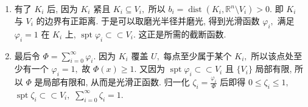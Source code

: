 \documentclass[../../main.tex]{subfiles}
\begin{document}
\begin{note}
\begin{enumerate}[(1)]
不能直接取一个充分小的正数$\varepsilon_i$去构造$K_i=\{x\in U:a_i(x)\geqslant \varepsilon _i\}$的原因：开集边界附近的点，其距离可以无限小。
因为 \(V_i\) 是开集，所以点 \(x\) 可以无限靠近 \(V_i\) 的边界。无论你预先给每个 \(V_i\) 选定了一个多么小的固定正数 \(\varepsilon_i\)，只要 \(x\) 离边界足够近，它到边界的距离 \(a_i(x)\) 就会比 \(\varepsilon_i\) 还要小。此时，这个点就不满足 \(a_i(x)\geqslant\varepsilon_i\)，从而被排除在 \(K_i\) 之外。进而导致$\{K_i\}$覆盖不了$U$.

为什么会导致覆盖失败？
假设点 \(x\) 只属于唯一的一个开集 \(V_i\) (即 \(x\notin V_j, j\neq i\))，且在 \(V_i\) 中非常靠近边界，使得
\(0<a_i(x)<\varepsilon_i.\)
由于 \(x\notin V_j\)，根据距离函数的定义，对于所有 \(j\neq i\)，都有 \(a_j(x)=0<\varepsilon_j.\) 于是，对所有的指标 \(k\)，都有 \(a_k(x)<\varepsilon_k.\) 这意味着 \(x\) 不属于任何 \(K_k\)，即
\(x\notin\bigcup\limits_{k=0}^{\infty}K_k.\)
这样一来，覆盖 \(U=\bigcup\limits_{k=0}^{\infty}K_k\) 就失败了。

具体反例(一维)：
取 \(U=(0,1)\)，设 \(V_1=(0,0.1)\)，\(V_2=(0.05,1)\)。假设你为 \(V_1\) 选取了 \(\varepsilon_1=0.01.\)
现在取点 \(x=0.001\)。显然 \(x\in V_1\)，但是 \(x\) 到 \(V_1\) 边界 \(0\) 的距离只有 \(0.001\)，即
\(a_1(0.001)=0.001<0.01=\varepsilon_1.\)
因此 \(x\notin K_1\)。又因为 \(x\notin V_2\)，所以 \(a_2(x)=0<\varepsilon_2\)，即 \(x\notin K_2\)。于是点 \(x=0.001\) 就被漏掉了，它不在任何 \(K_i\) 中。

\item 有了 $K_i$ 后, 因为 $K_i$ 紧且 $K_i\subseteq V_i,$ 所以
$b_i=\operatorname{dist}(K_i,\mathbb{R}^{n}\setminus V_i)>0.$
即 $K_i$ 与 $V_i$ 的边界有正距离. 于是可以取磨光半径并磨光, 得到光滑函数 $\varphi_i,$ 满足
$\varphi_i=1$ 在 $K_i$ 上,
$\operatorname{spt}\varphi_i\subset\subset V_i.$
这正是所需的截断函数.
\item 最后令
$\Phi=\sum\limits_{i=0}^{\infty}\varphi_i.$
因为 $K_i$ 覆盖 $U,$ 每点至少属于某个 $K_i,$ 所以该点处至少有一个 $\varphi_i=1,$ 故
$\Phi(x)\geqslant1.$
又因为 $\operatorname{spt}\varphi_i\subset\subset V_i$ 且 $\{V_i\}$ 局部有限, 所以 $\Phi$ 是局部有限和, 从而是光滑正函数. 归一化
$\zeta_i=\frac{\varphi_i}{\Phi}$
后即得
$0\leqslant\zeta_i\leqslant1,$
$\operatorname{spt}\zeta_i\subset\subset V_i,$
$\sum\limits_{i=0}^{\infty}\zeta_i=1.$
\end{enumerate}
\end{note}
\end{document}
